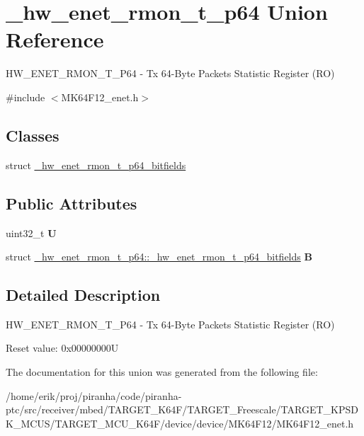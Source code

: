 \hypertarget{union__hw__enet__rmon__t__p64}{}\section{\+\_\+hw\+\_\+enet\+\_\+rmon\+\_\+t\+\_\+p64 Union Reference}
\label{union__hw__enet__rmon__t__p64}


H\+W\+\_\+\+E\+N\+E\+T\+\_\+\+R\+M\+O\+N\+\_\+\+T\+\_\+\+P64 -\/ Tx 64-\/\+Byte Packets Statistic Register (RO)  




{\ttfamily \#include $<$M\+K64\+F12\+\_\+enet.\+h$>$}

\subsection*{Classes}
\begin{DoxyCompactItemize}
\item 
struct \hyperlink{struct__hw__enet__rmon__t__p64_1_1__hw__enet__rmon__t__p64__bitfields}{\+\_\+hw\+\_\+enet\+\_\+rmon\+\_\+t\+\_\+p64\+\_\+bitfields}
\end{DoxyCompactItemize}
\subsection*{Public Attributes}
\begin{DoxyCompactItemize}
\item 
uint32\+\_\+t {\bfseries U}\hypertarget{union__hw__enet__rmon__t__p64_a23689214d4a496961864bf1974b1f273}{}\label{union__hw__enet__rmon__t__p64_a23689214d4a496961864bf1974b1f273}

\item 
struct \hyperlink{struct__hw__enet__rmon__t__p64_1_1__hw__enet__rmon__t__p64__bitfields}{\+\_\+hw\+\_\+enet\+\_\+rmon\+\_\+t\+\_\+p64\+::\+\_\+hw\+\_\+enet\+\_\+rmon\+\_\+t\+\_\+p64\+\_\+bitfields} {\bfseries B}\hypertarget{union__hw__enet__rmon__t__p64_ace84b337b7f82595edd186a0b2eb7034}{}\label{union__hw__enet__rmon__t__p64_ace84b337b7f82595edd186a0b2eb7034}

\end{DoxyCompactItemize}


\subsection{Detailed Description}
H\+W\+\_\+\+E\+N\+E\+T\+\_\+\+R\+M\+O\+N\+\_\+\+T\+\_\+\+P64 -\/ Tx 64-\/\+Byte Packets Statistic Register (RO) 

Reset value\+: 0x00000000U

The documentation for this union was generated from the following file\+:\begin{DoxyCompactItemize}
\item 
/home/erik/proj/piranha/code/piranha-\/ptc/src/receiver/mbed/\+T\+A\+R\+G\+E\+T\+\_\+\+K64\+F/\+T\+A\+R\+G\+E\+T\+\_\+\+Freescale/\+T\+A\+R\+G\+E\+T\+\_\+\+K\+P\+S\+D\+K\+\_\+\+M\+C\+U\+S/\+T\+A\+R\+G\+E\+T\+\_\+\+M\+C\+U\+\_\+\+K64\+F/device/device/\+M\+K64\+F12/M\+K64\+F12\+\_\+enet.\+h\end{DoxyCompactItemize}
